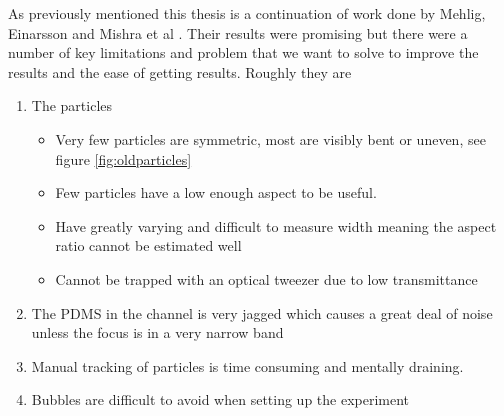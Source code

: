 As previously mentioned this thesis is a continuation of work done by Mehlig, Einarsson and Mishra et al \cite{AntonThesis, JonasExperiment}. Their results were promising but there were a number of key limitations and problem that we want to solve to improve the results and the ease of getting results. Roughly they are
\begin{enumerate}
	\item The particles
	\begin{itemize}
		\item Very few particles are symmetric, most are visibly bent or uneven, see figure \ref{fig:oldparticles}
		\item Few particles have a low enough aspect to be useful.
		\item Have greatly varying and difficult to measure width meaning the aspect ratio cannot be estimated well
		\item Cannot be trapped with an optical tweezer due to low transmittance
	\end{itemize}
	\item The PDMS in the channel is very jagged which causes a great deal 
			of noise unless the focus is in a very narrow band
	\item Manual tracking of particles is time consuming and mentally draining.
	\item Bubbles are difficult to avoid when setting up the experiment
\end{enumerate}

